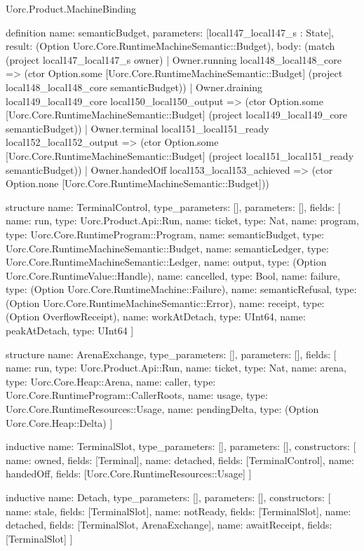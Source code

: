 \begin{lexlean}{Uorc.Product.MachineBinding}
\begin{semanticmodule}
definition{
  name: semanticBudget,
  parameters: [local147_local147_s : State],
  result: (Option Uorc.Core.RuntimeMachineSemantic::Budget),
  body: (match (project local147_local147_s owner)
    | Owner.running local148_local148_core => (ctor Option.some [Uorc.Core.RuntimeMachineSemantic::Budget] (project local148_local148_core semanticBudget))
    | Owner.draining local149_local149_core local150_local150_output => (ctor Option.some [Uorc.Core.RuntimeMachineSemantic::Budget] (project local149_local149_core semanticBudget))
    | Owner.terminal local151_local151_ready local152_local152_output => (ctor Option.some [Uorc.Core.RuntimeMachineSemantic::Budget] (project local151_local151_ready semanticBudget))
    | Owner.handedOff local153_local153_achieved => (ctor Option.none [Uorc.Core.RuntimeMachineSemantic::Budget]))
}

structure{
  name: TerminalControl,
  type_parameters: [],
  parameters: [],
  fields: [
    {name: run, type: Uorc.Product.Api::Run},
    {name: ticket, type: Nat},
    {name: program, type: Uorc.Core.RuntimeProgram::Program},
    {name: semanticBudget, type: Uorc.Core.RuntimeMachineSemantic::Budget},
    {name: semanticLedger, type: Uorc.Core.RuntimeMachineSemantic::Ledger},
    {name: output, type: (Option Uorc.Core.RuntimeValue::Handle)},
    {name: cancelled, type: Bool},
    {name: failure, type: (Option Uorc.Core.RuntimeMachine::Failure)},
    {name: semanticRefusal, type: (Option Uorc.Core.RuntimeMachineSemantic::Error)},
    {name: receipt, type: (Option OverflowReceipt)},
    {name: workAtDetach, type: UInt64},
    {name: peakAtDetach, type: UInt64}
  ]
}

structure{
  name: ArenaExchange,
  type_parameters: [],
  parameters: [],
  fields: [
    {name: run, type: Uorc.Product.Api::Run},
    {name: ticket, type: Nat},
    {name: arena, type: Uorc.Core.Heap::Arena},
    {name: caller, type: Uorc.Core.RuntimeProgram::CallerRoots},
    {name: usage, type: Uorc.Core.RuntimeResources::Usage},
    {name: pendingDelta, type: (Option Uorc.Core.Heap::Delta)}
  ]
}

inductive{
  name: TerminalSlot,
  type_parameters: [],
  parameters: [],
  constructors: [
    {name: owned, fields: [Terminal]},
    {name: detached, fields: [TerminalControl]},
    {name: handedOff, fields: [Uorc.Core.RuntimeResources::Usage]}
  ]
}

inductive{
  name: Detach,
  type_parameters: [],
  parameters: [],
  constructors: [
    {name: stale, fields: [TerminalSlot]},
    {name: notReady, fields: [TerminalSlot]},
    {name: detached, fields: [TerminalSlot, ArenaExchange]},
    {name: awaitReceipt, fields: [TerminalSlot]}
  ]
}


\end{semanticmodule}
\end{lexlean}
